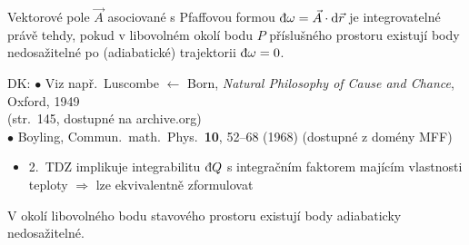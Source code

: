 \begin{veta}
Vektorové pole $\vec A$ asociované s Pfaffovou formou $\dbar\omega = \vec A\cdot\dd\vec r$ je integrovatelné právě tehdy, pokud v libovolném okolí bodu $P$ příslušného prostoru existují body nedosažitelné po (adiabatické) trajektorii $\dbar\omega = 0$.
\end{veta}
\begin{flushright}\small
DK: $\bullet$ Viz např.\ Luscombe $\leftarrow$ Born, \emph{Natural Philosophy of Cause and Chance}, Oxford, 1949 \\
(str.\ 145, dostupné na archive.org) \\
$\bullet$ Boyling, Commun.\ math.\ Phys.\ \textbf{10}, 52--68 (1968) (dostupné z domény MFF)
\end{flushright}

\begin{itemize}
  \item 2.\ TDZ implikuje integrabilitu $\dbar Q$ s integračním faktorem majícím vlastnosti teploty $\Rightarrow$ lze ekvivalentně zformulovat
\end{itemize}
\begin{veta}
V okolí libovolného bodu stavového prostoru existují body adiabaticky nedosažitelné.
\end{veta}
